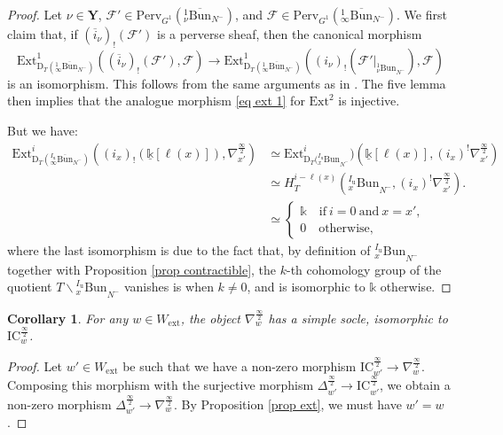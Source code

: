 \documentclass[11pt]{amsart}
\theoremstyle{plain}
\newtheorem{coro}[thm]{Corollary}
\theoremstyle{remark}
\numberwithin{equation}{section}
\begin{document}
 \begin{proof}
Let $\nu\in\mathbf{Y}$, $\mathcal{F}'\in \mathrm{Perv}_{G^1}({^1_\nu\overline{\mathrm{Bun}}_{N^-}})$, and $\mathcal{F}\in \mathrm{Perv}_{G^1}({^1_\infty\overline{\mathrm{Bun}}_{N^-}})$.  We first claim that, if $(\overline{i}_\nu)_!(\mathcal{F}')$ is a perverse sheaf, then the canonical morphism
     \begin{equation}\label{eq ext 1}
    \mathrm{Ext}^1_{\mathrm{D}_T({^1_\infty\overline{\mathrm{Bun}}_{N^-}})}((\overline{i}_\nu)_!(\mathcal{F}'),\mathcal{F})\to  \mathrm{Ext}^1_{\mathrm{D}_T({^1_\infty\overline{\mathrm{Bun}}_{N^-}})}((i_\nu)_!(\mathcal{F}'|_{{^1_\nu\mathrm{Bun}}_{N^-}}),\mathcal{F})
     \end{equation}
     is an isomorphism. This follows from the same arguments as in \cite[Proposition 4.2.14]{ABBGM}. The five lemma then implies that the analogue morphism \eqref{eq ext 1} for $\mathrm{Ext}^2$ is injective.

     But we have:
     \begin{align*}
         \mathrm{Ext}^i_{\mathrm{D}_T({^{I_\mathrm{u}}_\infty\overline{\mathrm{Bun}}_{N^-}})}((i_x)_!(\underline{\mathbb{k}}[\ell(x)]),\nabla_{x'}^{\frac{\infty}{2}})&\simeq  \mathrm{Ext}^i_{\mathrm{D}_T({^{I_\mathrm{u}}_x\mathrm{Bun}}_{N^-}})(\underline{\mathbb{k}}[\ell(x)],(i_x)^!\nabla_{x'}^{\frac{\infty}{2}})\\
         &\simeq H^{i-\ell(x)}_T({^{I_\mathrm{u}}_x\mathrm{Bun}}_{N^-},(i_x)^!\nabla_{x'}^{\frac{\infty}{2}}).\\
         &\simeq \begin{cases} \mathbb{k}\quad\text{if}~i=0~\text{and}~x=x',\\0\quad\text{otherwise},\end{cases}
     \end{align*}
     where the last isomorphism is due to the fact that, by definition of ${^{I_\mathrm{u}}_x\mathrm{Bun}}_{N^-}$ together with Proposition \ref{prop contractible}, the $k$-th cohomology group of the quotient $T\backslash{^{I_\mathrm{u}}_x\mathrm{Bun}}_{N^-}$ vanishes is when  $k\neq 0$, and is isomorphic to $\mathbb{k}$ otherwise. 
 \end{proof}
 \begin{coro}\label{coro simple socle IC}
     For any $w\in W_\mathrm{ext}$, the object $\nabla^{\frac{\infty}{2}}_w$ has a simple socle, isomorphic to $\mathrm{IC}_w^{\frac{\infty}{2}}$.
 \end{coro}
 \begin{proof}
     Let $w'\in W_\mathrm{ext}$ be such that we have a non-zero morphism $\mathrm{IC}_{w'}^{\frac{\infty}{2}}\to \nabla^{\frac{\infty}{2}}_w$. Composing this morphism with the surjective morphism $\Delta^{\frac{\infty}{2}}_{w'}\to \mathrm{IC}_{w'}^{\frac{\infty}{2}}$, we obtain a non-zero morphism $\Delta^{\frac{\infty}{2}}_{w'}\to \nabla^{\frac{\infty}{2}}_w$. By Proposition \ref{prop ext}, we must have $w'=w$.
 \end{proof}
\end{document}
